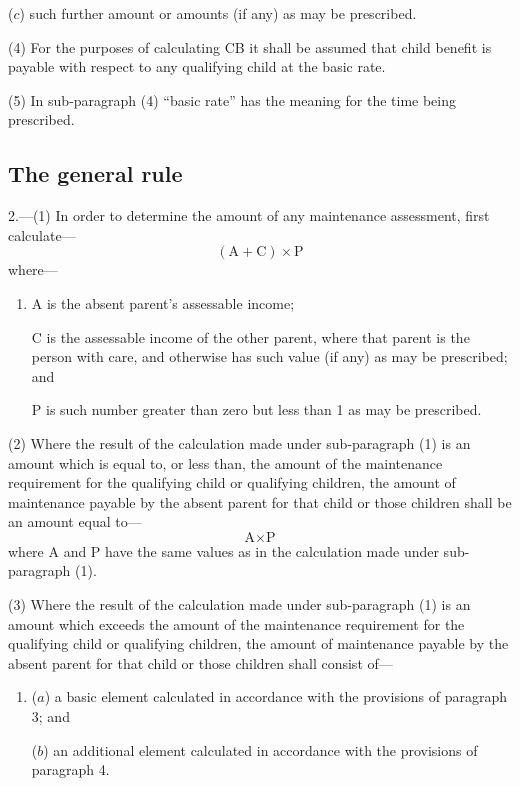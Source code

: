 \documentclass[12pt,a4paper]{article}
\begin{document}
{\begin{enumerate}
($c$) such further amount or amounts (if any) as may be prescribed.
\end{enumerate}

(4)
For the purposes of calculating CB it shall be assumed that child benefit is payable with respect to any qualifying child at the basic rate.

(5)
In sub-paragraph (4) “basic rate” has the meaning for the time being prescribed.

\subsection*{The general rule}

2.---(1) In order to determine the amount of any maintenance assessment, first calculate---
\[ (\textrm{A} + \textrm{C}) \times \textrm{P}\]
where---
\begin{enumerate}\item[]
A is the absent parent’s assessable income;

C is the assessable income of the other parent, where that parent is the person with care, and otherwise has such value (if any) as may be prescribed; and

P is such number greater than zero but less than 1 as may be prescribed.
\end{enumerate}

(2) Where the result of the calculation made under sub-paragraph (1) is an amount which is equal to, or less than, the amount of the maintenance requirement for the qualifying child or qualifying children, the amount of maintenance payable by the absent parent for that child or those children shall be an amount equal to—
\[\textrm{A} \times \textrm{P}\]
where A and P have the same values as in the calculation made under sub-paragraph (1).

(3) Where the result of the calculation made under sub-paragraph (1) is an amount which exceeds the amount of the maintenance requirement for the qualifying child or qualifying children, the amount of maintenance payable by the absent parent for that child or those children shall consist of---
\begin{enumerate}\item[]
($a$) a basic element calculated in accordance with the provisions of paragraph 3; and

($b$) an additional element calculated in accordance with the provisions of paragraph 4.
\end{enumerate}

}
\end{document}
